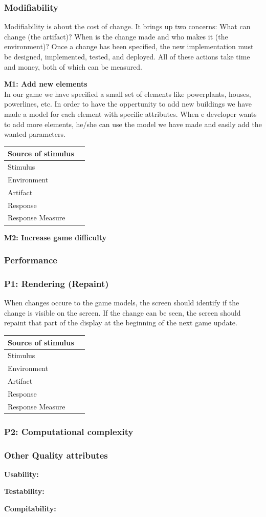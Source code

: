 \subsubsection{Modifiability}

Modifiability is about the cost of change. It brings up two concerns: What can change (the artifact)? 
When is the change made and who makes it (the environment)? 
Once a change has been specified, the new implementation must be designed, 
implemented, tested, and deployed. All of these actions take time and money, both of which can be measured.


{\bf M1: Add new elements} \\
In our game we have specified a small set of elements like powerplants, houses, powerlines, etc.
In order to have the oppertunity to add new buildings we have made a model for each element
with specific attributes. When e developer wants to add more elements, he/she can use the model
we have made and easily add the wanted parameters. 

\begin{tabular}{| l | l |}
	\hline
	Source of stimulus & \\ \hline
	Stimulus & \\ \hline
	Environment & \\ \hline
	Artifact & \\ \hline
	Response & \\ \hline
	Response Measure & \\ \hline
	
\end{tabular}

{\bf M2: Increase game difficulty}


\subsubsection{Performance}

\subsubsection*{P1: Rendering (Repaint)}
When changes occure to the game models, the screen should identify if the change 
is visible on the screen. If the change can be seen, the screen should repaint 
that part of the display at the beginning of the next game update.

\begin{tabular}{| l | l |}
	\hline
	Source of stimulus & \\ \hline
	Stimulus & \\ \hline
	Environment & \\ \hline
	Artifact & \\ \hline
	Response & \\ \hline
	Response Measure & \\ \hline

\end{tabular}

\subsubsection*{P2: Computational complexity}


\subsubsection{Other Quality attributes}
{\bf Usability: }

{\bf Testability:}

{\bf Compitability:}
